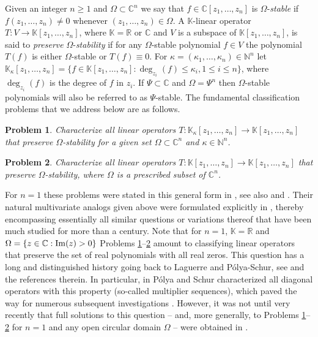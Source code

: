 \documentclass[10pt,reqno]{amsart}
\theoremstyle{plain}
\newtheorem{problem}{Problem}
\theoremstyle{definition}
\theoremstyle{remark}
\numberwithin{equation}{section}
\newcommand{\NN}{\mathbb{N}}
\newcommand{\RR}{\mathbb{R}}
\newcommand{\CC}{\mathbb{C}}
\newcommand{\KK}{\mathbb{K}}
\renewcommand{\Im}{{\rm Im}}
\begin{document}
Given an integer $n\ge 1$ and $\Omega \subset \CC^n$ we say 
that $f\in\CC[z_1,\ldots,z_n]$ is 
$\Omega$-{\em stable}
if $f(z_1,\ldots,z_n)\neq 0$ whenever $(z_1,\ldots,z_n)\in\Omega$. 
A $\KK$-linear operator 
$T:V\to \KK[z_1,\ldots,z_n]$, where $\KK=\RR$ or $\CC$ and 
$V$ is a subspace of $\KK[z_1,\ldots,z_n]$, is said to {\em preserve} 
$\Omega$-{\em stability} if for any 
$\Omega$-stable polynomial $f\in V$ the 
polynomial $T(f)$ is either 
$\Omega$-stable or $T(f)\equiv 0$.
For $\kappa=(\kappa_1,\ldots,\kappa_n) \in \NN^n$ let 
$\KK_\kappa[z_1,\ldots, z_n]
=\{f\in \KK[z_1,\ldots, z_n]:\deg_{z_i}(f)\le \kappa_i,1\le i\le n\}$, 
where $\deg_{z_i}(f)$ is the degree of $f$ in $z_i$. If $\Psi\subset \CC$ and 
$\Omega=\Psi^n$ then $\Omega$-stable polynomials will also be referred to as 
$\Psi$-stable. The fundamental classification problems that we address below  
are as follows.

\begin{problem}\label{prob1}
Characterize all linear operators 
$T:\KK_\kappa[z_1,\ldots, z_n]\to \KK[z_1,\ldots,z_n]$ that preserve 
$\Omega$-stability for a given set $\Omega\subset\CC^n$ and 
$\kappa\in\NN^n$.
\end{problem}

\begin{problem}\label{prob2}
Characterize all linear operators 
$T:\KK[z_1,\ldots, z_n]\to \KK[z_1,\ldots,z_n]$ that preserve 
$\Omega$-stability, where $\Omega$ is a prescribed subset of 
$\CC^n$.
\end{problem}

For $n=1$ these problems were stated in this general form in 
\cite{CC1,cso}, see also \cite{iserles1} and \cite[pp.~182-183]{RS}. Their
natural multivariate analogs given above were formulated explicitly in 
\cite{BBS3,BBCV}, thereby encompassing essentially all similar questions or 
variations thereof that have been much studied for more than a century.
Note that for $n=1$, $\KK=\RR$ and $\Omega=\{z\in\CC:\Im(z)>0\}$ 
Problems \ref{prob1}--\ref{prob2} amount to classifying linear operators that 
preserve the set of real polynomials with all real zeros. This question has 
a long and distinguished history going back to Laguerre and 
P\'olya-Schur, see \cite{BBCV,CC1} and the references 
therein. In particular, in \cite{PS} P\'olya and Schur characterized all 
diagonal operators with this property (so-called multiplier sequences), 
which paved the way for numerous subsequent investigations 
\cite{BBS1,BBS3,CCS,CC2,cso,fisk,iserles1,Le,M,pol-coll,RS,schur}.
However, it was not until very recently that full solutions to this question 
-- and, more generally, to Problems \ref{prob1}--\ref{prob2} for $n=1$ and any 
open circular domain $\Omega$ -- were obtained in \cite{BBS1}.  
\end{document}
